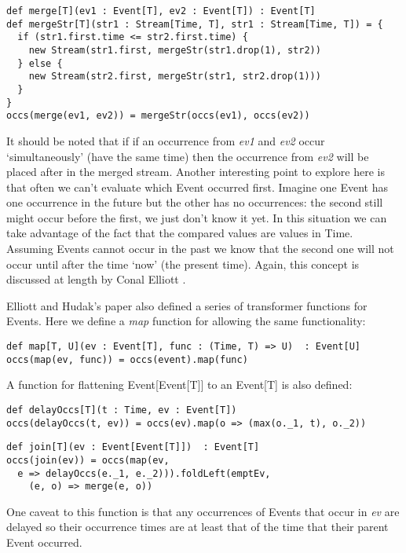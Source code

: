 \begin{verbatim}
def merge[T](ev1 : Event[T], ev2 : Event[T]) : Event[T]
def mergeStr[T](str1 : Stream[Time, T], str1 : Stream[Time, T]) = {
  if (str1.first.time <= str2.first.time) {
    new Stream(str1.first, mergeStr(str1.drop(1), str2))
  } else {
    new Stream(str2.first, mergeStr(str1, str2.drop(1)))
  }
}
occs(merge(ev1, ev2)) = mergeStr(occs(ev1), occs(ev2))
\end{verbatim}            

      It should be noted that if if an occurrence from \emph{ev1} and \emph{ev2} occur `simultaneously' (have the same time) 
      then
      the occurrence from \emph{ev2} will be placed after in the merged stream. Another interesting point to explore
      here is that often we can't evaluate which Event occurred first. Imagine one Event has one occurrence in
      the future but the other has no occurrences: the second still might occur before the first, we just don't know it
      yet. In this situation we can take advantage of the fact that the compared values are values in Time. Assuming
      Events cannot occur in the past we know that the second one will not occur until after the time `now' (the
      present time). Again, this concept is discussed at length by Conal Elliott \cite{Elliott2009}.
       
      Elliott and Hudak's paper also defined a series of transformer functions for Events. Here we define a
     \emph{map} function for allowing the same functionality:

\begin{verbatim}
def map[T, U](ev : Event[T], func : (Time, T) => U)  : Event[U]
occs(map(ev, func)) = occs(event).map(func)
\end{verbatim}     

      A function for flattening Event[Event[T]] to an Event[T] is also defined:

\begin{verbatim}
def delayOccs[T](t : Time, ev : Event[T])
occs(delayOccs(t, ev)) = occs(ev).map(o => (max(o._1, t), o._2))
\end{verbatim}

\begin{verbatim}
def join[T](ev : Event[Event[T]])  : Event[T]
occs(join(ev)) = occs(map(ev, 
  e => delayOccs(e._1, e._2))).foldLeft(emptEv,
    (e, o) => merge(e, o))
\end{verbatim}        

      One caveat to this function is that any occurrences of Events that occur in \emph{ev} are delayed
      so their occurrence times are at least that of the time that their parent Event occurred.
        
